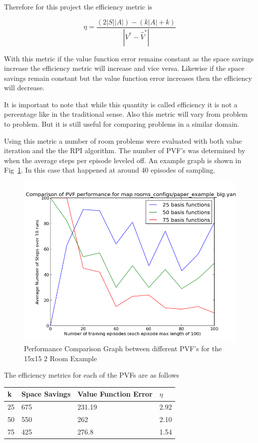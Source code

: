 \documentclass[12pt, letterpaper, final]{report}
\begin{document}
Therefore for this project the efficiency metric is

\[
\eta = \frac{( 2|S||A|) - (k|A| + k)}{|V^{*} - \hat{V}^{*}|}
\]

With this metric if the value function error remains constant as the
space savings increase the efficiency metric will increase and vice
versa. Likewise if the space savings remain constant but the value
function error increases then the efficiency will decrease. 

It is
important to note that while this quantity is called efficiency it is
not a percentage like in the traditional sense. Also this metric will
vary from problem to problem. But it is still useful for comparing
problems in a similar domain.

Using this metric a number of room problems were evaluated with both
value iteration and the the RPI algorithm. The number of PVF's was
determined by when the average steps per episode leveled off. An
example graph is shown in Fig~\ref{performanceComparisonGraph1}. In this
case that happened at around 40 episodes of sampling.

\FloatBarrier
\begin{figure}[h!]
\centering
\includegraphics[scale=.5]{images/paper_example_big_comparison_graph02.png}
\caption{Performance Comparison Graph between different PVF's for the
  15x15 2 Room Example}
\label{performanceComparisonGraph1}
\end{figure}
\FloatBarrier

The efficiency metrics for each of the PVFs are as follows

\FloatBarrier
\begin{table}[h!]
  \begin{tabular}{|l|l|l|l|}
  \hline
  {\bf k} & {\bf Space Savings} & {\bf Value Function Error} & $\eta$\\ \hline
  25 & 675 & 231.19 & 2.92 \\ \hline
  50 & 550 & 262      & 2.10  \\ \hline
  75 & 425 &  276.8 & 1.54 \\ \hline
\end{tabular}
\end{table}
\FloatBarrier
\end{document}
